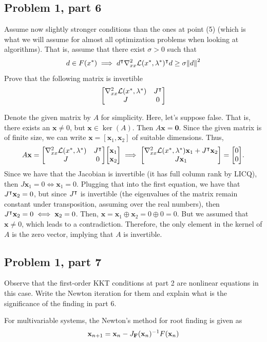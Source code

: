 \subsection{Problem 1, part 6}
Assume now slightly stronger conditions than the ones at point (5) (which is what we will assume for almost all optimization problems when looking at algorithms). That is, assume that there exist $\sigma > 0$ such that
\[d \in F(x^{*}) \implies d^{\intercal} \nabla^2_{xx}\mathcal{L}(x^{*}, \mathrm{\lambda}^{*})^{\intercal} d \geq \sigma\norm{d}^2\]
Prove that the following matrix is invertible
\[\mqty[\grad^2_{xx}\scL(x\star, \lm\star) &J\T\\ J&0]\]
\partbreak
\begin{solution}

    Denote the given matrix by $A$ for simplicity. Here, let's suppose false. That is, there exists an $\textbf{x} \neq 0$, but $\textbf{x} \in \ker (A)$. Then $A\textbf{x} = \textbf{0}$. Since the given matrix is of finite size, we can write $\textbf{x} = [\textbf{x}_1, \textbf{x}_2]$ of suitable dimensions. Thus, 
    \[A\textbf{x} = \mqty[\grad^2_{xx}\scL(x\star, \lm\star) &J\T\\ J&0]\mqty[\textbf{x}_1\\\textbf{x}_2] \implies \mqty[\grad^2_{xx}\scL(x\star, \lm\star)\textbf{x}_1 + J\T \textbf{x}_2\\ J\textbf{x}_1] = \mqty[0\\0].\]
    Since we have that the Jacobian is invertible (it has full column rank by LICQ), then $J\textbf{x}_1 = 0 \iff \textbf{x}_1 = 0$. Plugging that into the first equation, we have that $J^{\intercal} \textbf{x}_2 = 0$, but since $J^{\intercal}$ is invertible (the eigenvalues of the matrix remain constant under transposition, assuming over the real numbers), then $J^{\intercal} \textbf{x}_2 = 0 \iff \textbf{x}_2 = 0$. Then, $\textbf{x} = \textbf{x}_1 \oplus \textbf{x}_2 = 0 \oplus 0 = 0$. But we assumed that $\textbf{x} \neq 0$, which leads to a contradiction. Therefore, the only element in the kernel of $A$ is the zero vector, implying that $A$ is invertible.  
\end{solution}

\newpage
\subsection{Problem 1, part 7}
Observe that the first-order KKT conditions at part 2 are nonlinear equations in this case. Write the Newton iteration for them and explain what is the significance of the finding in part 6. 
\partbreak
\begin{solution}

    For multivariable systems, the Newton's method for root finding is given as 
    \[\textbf{x}_{n+1} = \textbf{x}_n - J_\textbf{F}(\textbf{x}_n)^{-1} F(\textbf{x}_n)\]
\end{solution}

